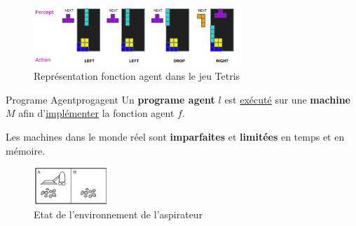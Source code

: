 \begin{example}\leavevmode
    \begin{figure}[H]
        \centering
        \includegraphics[width=0.7\textwidth]{./pictures/agent_func.png}
        \caption{Représentation fonction agent dans le jeu Tetris}
        \label{fig:agent} 
    \end{figure}
\end{example}

\begin{definition}{Programe Agent}{progagent}
    Un \textbf{programe agent} $l$ est \underline{exécuté} sur une \textbf{machine} $M$ 
    afin d'\underline{implémenter} la fonction agent $f$.
\end{definition}
\begin{remark}\leavevmode
    Les machines dans le monde réel sont \textbf{imparfaites} et \textbf{limitées} en temps et en mémoire.
\end{remark}

\begin{figure}[H]
    \begin{center}
        \includegraphics[width=0.25\textwidth]{./pictures/vac_state.png}
    \end{center}
    \caption{Etat de l'environnement de l'aspirateur}\label{fig:vac_state}
\end{figure}

